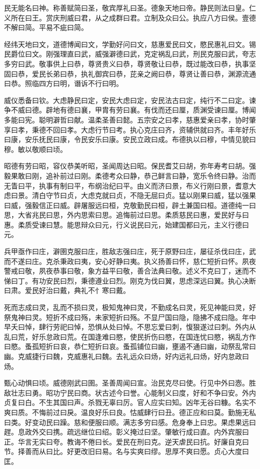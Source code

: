 \documentclass[]{article}
\begin{document}
民无能名曰神。称善赋简曰圣，敬宾厚礼曰圣。德象天地曰帝。静民则法曰皇。仁义所在曰王。赏庆刑威曰君，从之成群曰君。立制及众曰公。执应八方曰侯。壹德不解曰简。平易不疵曰简。

经纬天地曰文，道德博闻曰文，学勤好问曰文，慈惠爱民曰文，愍民惠礼曰文。锡民爵位曰文。刚强理直曰武，威强澼德曰武，克定祸乱曰武，刑民克服曰武，夸志多穷曰武。敬事供上曰恭，尊贤贵义曰恭，尊贤敬让曰恭，既过能改曰恭，执事坚固曰恭，爱民长弟曰恭，执礼御宾曰恭，芘亲之阙曰恭，尊贤让善曰恭，渊源流通曰恭。照临四方曰明，谮诉不行曰明。

威仪悉备曰钦。大虑静民曰定，安民大虑曰定，安民法古曰定，纯行不二曰定。谏争不威曰德。辟地有德曰襄，甲胄有劳曰襄。有伐而还曰厘，质渊受谏曰厘。博闻多能曰宪。聪明澼哲曰献。温柔圣善曰懿。五宗安之曰孝，慈惠爱亲曰孝，协时肇享曰孝，秉德不回曰孝。大虑行节曰考。执心克庄曰齐，资辅供就曰齐。丰年好乐曰康，安乐抚民曰康，令民安乐曰康。安民立政曰成。布德执以曰穆，中情见貌曰穆。敏以敬顺曰顷。

昭德有劳曰昭，容仪恭美听昭，圣闻周达曰昭。保民耆艾曰胡，弥年寿考曰胡。强毅果敢曰刚，追补前过曰刚。柔德考众曰静，恭己鲜言曰静，宽乐令终曰静。治而无眚曰平，执事有制曰平，布纲治纪曰平。由义而济曰景，布义行刚曰景，耆意大虑曰景。清白守节曰贞，大虑克就曰贞，不隐无屈曰贞。猛以刚果曰威，猛以强果曰威，强毅信正曰威。辟屠服远曰桓，克敬勤民曰桓，辟土兼国曰桓。道德纯一曰思，大省兆民曰思，外内思索曰思。追悔前过曰思。柔质慈民曰惠，爱民好与曰惠。柔质受谏曰慧。能思辩众曰元，行义说民曰元，始建国都曰元，主义行德曰元。

兵甲亟作曰庄，澼圉克服曰庄，胜敌志强曰庄，死于原野曰庄，屡征杀伐曰庄，武而不遂曰庄。克杀秉政曰夷，安心好静曰夷。执义扬善曰怀，慈仁短折曰怀。夙夜警戒曰敬，夙夜恭事曰敬，象方益平曰敬，善合法典曰敬。述义不克曰丁，迷而不悌曰丁。有功安民曰烈，秉德遵业曰烈。刚克为伐曰翼，思虑深远曰翼。执心决断曰肃。爱民好治曰戴，典礼不忄寒曰戴。

死而志成曰灵，乱而不损曰灵，极知鬼神曰灵，不勤成名曰灵，死见神能曰灵，好祭鬼神曰灵。短折不成曰殇，未家短折曰殇。不显尸国曰隐，隐拂不成曰隐。年中早夭曰悼，肆行劳祀曰悼，恐惧从处曰悼。不思忘爱曰刺，愎狠遂过曰刺。外内从乱曰荒，好乐怠政曰荒。在国逢难曰愍，使民折伤曰愍，在国连忧曰愍，祸乱方作曰愍。蚤孤短折曰哀，恭仁短折曰哀。蚤孤铺位曰幽，壅遏不通曰幽，动祭乱常曰幽。克威捷行曰魏，克威惠礼曰魏。去礼远众曰炀，好内远礼曰炀，好内怠政曰炀。

甄心动惧曰顷。威德刚武曰圉。圣善周闻曰宣。治民克尽曰使。行见中外曰悫。胜敌壮志曰勇。昭功宁民曰商。状古述今曰誉。心能制义曰度，好和不争曰安。外内贞复曰白。不生其国曰声。杀戮无辜曰厉。官人应实曰知。凶年无谷曰糠。名实不爽曰质。不悔前过曰戾。温良好乐曰良。怙威肆行曰丑。德正应和曰莫。勤施无私曰类。好变动民曰躁。慈和便服曰顺。满志多穷曰感。危身奉上曰忠。果虑果远曰趕。息政外交曰携。疏远继位曰绍。彰义掩过曰坚。肇敏行成曰直。内外宾服曰正。华言无实曰夸。教诲不倦曰长。爱民在刑曰克。逆天虐民曰抗。好廉自克曰节。择善而从曰比。好更改旧曰易。名与实爽曰缪。思厚不爽曰愿。贞心大度曰匡。
\end{document}
